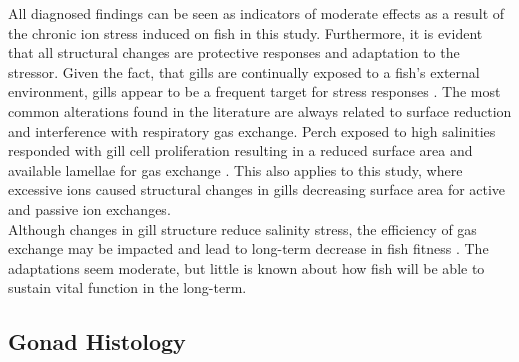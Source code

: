 \documentclass[twoside]{article}
\begin{document}
\begin{multicols}{2}
All diagnosed findings can be seen as indicators of moderate effects as a result of the chronic ion stress induced on fish in this study. Furthermore, it is evident that all structural changes are protective responses and adaptation to the stressor. Given the fact, that gills are continually exposed to a fish's external environment, gills appear to be a frequent target for stress responses \citep{harper2009}. The most common alterations found in the literature are always related to surface reduction and interference with respiratory gas exchange. Perch exposed to high salinities responded with gill cell proliferation resulting in a reduced surface area and available lamellae for gas exchange \citep{nero2006}.  This also applies to this study, where excessive ions caused structural changes in gills decreasing surface area for active and passive ion exchanges. \\
Although changes in gill structure reduce salinity stress, the efficiency of gas exchange may be impacted and lead to long-term decrease in fish fitness \citep{shahriari2013}. The adaptations seem moderate, but little is known about how fish will be able to sustain vital function in the long-term.  \\

\subsection*{Gonad Histology}

\end{multicols}
\end{document}
